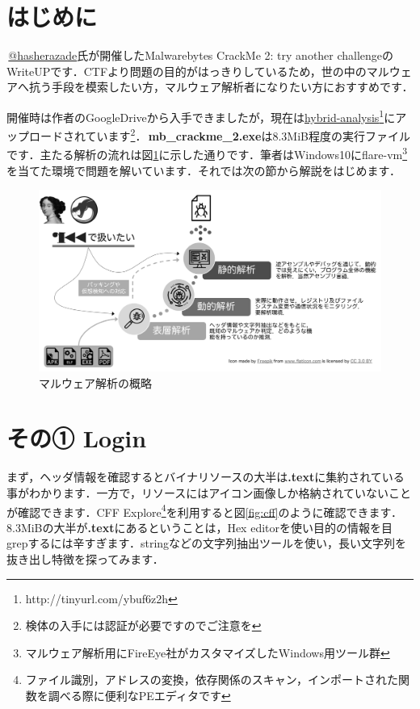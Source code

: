 \small
\section{はじめに}
\faTwitterSquare \,\href{https://twitter.com/hasherezade}{@hasherazade}氏が開催したMalwarebytes CrackMe 2: try another challengeのWriteUPです．CTFより問題の目的がはっきりしているため，世の中のマルウェアへ抗う手段を模索したい方，マルウェア解析者になりたい方におすすめです．

開催時は作者のGoogleDriveから入手できましたが，現在は\href{http://tinyurl.com/ybuf6z2h}{hybrid-analysis}\footnote{http://tinyurl.com/ybuf6z2h}にアップロードされています\footnote{検体の入手には認証が必要ですのでご注意を}．\faFileCodeO \,\textbf{mb\_crackme\_2.exe}は8.3MiB程度の実行ファイルです．主たる解析の流れは図\ref{fig:malware_analysis}に示した通りです．筆者はWindows10にflare-vm\footnote{マルウェア解析用にFireEye社がカスタマイズしたWindows用ツール群}を当てた環境で問題を解いています．それでは次の節から解説をはじめます．
\begin{figure}[H]
    \centering
    \includegraphics[width=0.85\linewidth]{./assets/takuzoo3868asset/flow_gray.png}
    \caption{マルウェア解析の概略}
    \label{fig:malware_analysis}
\end{figure}

\section{その① Login}
まず，ヘッダ情報を確認するとバイナリソースの大半は\textbf{.text}に集約されている事がわかります．一方で，リソースにはアイコン画像しか格納されていないことが確認できます．CFF Explore\footnote{ファイル識別，アドレスの変換，依存関係のスキャン，インポートされた関数を調べる際に便利なPEエディタです}を利用すると図\ref{fig:cff}のように確認できます．8.3MiBの大半が\textbf{.text}にあるということは，Hex editorを使い目的の情報を目grepするには辛すぎます．stringなどの文字列抽出ツールを使い，長い文字列を抜き出し特徴を探ってみます．

